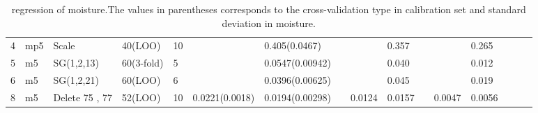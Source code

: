 \documentclass[a4paper,12pt,titlepage]{article} %
\numberwithin{equation}{section}  %
\begin{document}
\begin{landscape}
\begin{table}[]
\begin{tabular}{llllllllllllllll}
				4                    & mp5                  & Scale                & 40(LOO)    & 10 &                  & 0.405(0.0467)   &   &        & 0.357  &   &         & 0.265   &   &   &   \\
				5                    & m5                   & SG(1,2,13)           & 60(3-fold) & 5  &                  & 0.0547(0.00942) &   &        & 0.040  &   &         & 0.012   &   &   &   \\
				6                    & m5                   & SG(1,2,21)           & 60(LOO)    & 6  &                  & 0.0396(0.00625) &   &        & 0.045  &   &         & 0.019   &   &   &   \\
				8                    & m5                   & Delete 75 , 77       & 52(LOO)    & 10 & 0.0221(0.0018)   & 0.0194(0.00298) &   & 0.0124 & 0.0157 &   & 0.0047  & 0.0056  &   &   &   
			\end{tabular}
			
			\caption{regression of moisture.The values in parentheses corresponds to the cross-validation type in calibration set and standard deviation in moisture.}
			\label{tab:moisture}
		\end{table}
		
		
		
		

		
		\begin{table}[]
			

\end{table}
\end{landscape}
\end{document}
